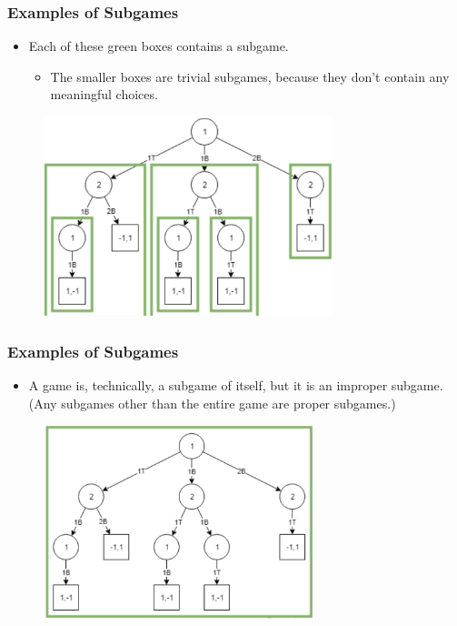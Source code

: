 \begin{frame}
\frametitle{Examples of Subgames}
\begin{itemize}
\item Each of these green boxes contains a subgame.
\begin{itemize}
\item The smaller boxes are \alert{trivial subgames}, because they don't contain any meaningful choices.
\end{itemize}
\end{itemize}
\begin{figure}
\centering
\includegraphics[width=0.75\textwidth]{figures/06SubgameExample02.png}
\end{figure}
\end{frame}

\begin{frame}
\frametitle{Examples of Subgames}
\begin{itemize}
\item A game is, technically, a subgame of itself, but it is an \alert{improper subgame}. (Any subgames other than the entire game are \alert{proper subgames}.)
\end{itemize}
\begin{figure}
\centering
\includegraphics[width=0.7\textwidth]{figures/06SubgameExample03.png}
\end{figure}
\end{frame}

